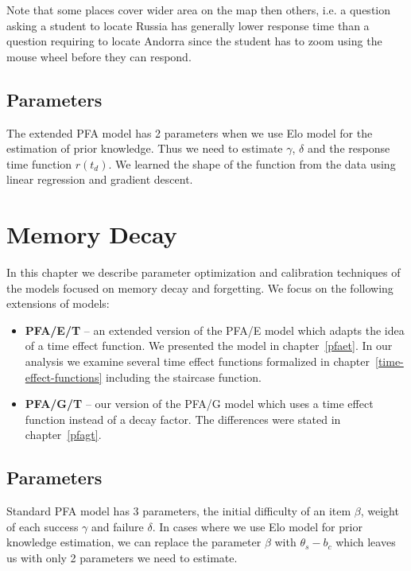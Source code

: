 Note that some places cover wider area on the map then others, i.e. a question asking a student to locate Russia has generally lower response time than a question requiring to locate Andorra since the student has to zoom using the mouse wheel before they can respond.

\subsection{Parameters}
\label{response-parameters}

The extended PFA model has 2 parameters when we use Elo model for the estimation of prior knowledge. Thus we need to estimate $\gamma$, $\delta$ and the response time function $r(t_d)$. We learned the shape of the function from the data using linear regression and gradient descent.

\section{Memory Decay}

In this chapter we describe parameter optimization and calibration techniques of the models focused on memory decay and forgetting. We focus on the following extensions of models:

\begin{itemize}
  \item \textbf{PFA/E/T} -- an extended version of the PFA/E model which adapts the idea of a time effect function. We presented the model in chapter~\ref{pfaet}. In our analysis we examine several time effect functions formalized in chapter~\ref{time-effect-functions} including the staircase function.
  \item \textbf{PFA/G/T} -- our version of the PFA/G model which uses a time effect function instead of a decay factor. The differences were stated in chapter~\ref{pfagt}.
\end{itemize}

\subsection{Parameters}
\label{memory-parameters}

Standard PFA model has 3 parameters, the initial difficulty of an item $\beta$, weight of each success $\gamma$ and failure $\delta$. In cases where we use Elo model for prior knowledge estimation, we can replace the parameter $\beta$ with $\theta_s - b_c$ which leaves us with only 2 parameters we need to estimate.

